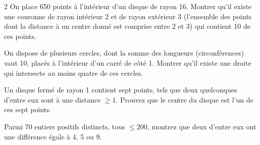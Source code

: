 \begin{problem}
    \begin{multicols}{2}
        On place 650 points à l'intérieur d'un disque de rayon 16.
        Montrer qu'il existe une couronne de rayon intérieur 2 et de rayon extérieur 3 (l'ensemble des points dont la distance à un centre donné est comprise entre 2 et 3) qui contient 10 de ces points.

        \centering

    \end{multicols}
\end{problem}

\begin{problem}
    On dispose de plusieurs cercles, dont la somme des longueurs (circonférences) vaut 10, placés à l'intérieur d'un carré de côté 1.
    Montrer qu'il existe une droite qui intersecte au moins quatre de ces cercles.
\end{problem}

\begin{problem}
    Un disque fermé de rayon 1 contient sept points, tels que deux quelconques d'entre eux sont à une distance \(\geq 1\).
    Prouvez que le centre du disque est l'un de ces sept points.
\end{problem}

\begin{problem}
    Parmi 70 entiers positifs distincts, tous \(\leq 200\), montrez que deux d'entre eux ont une différence égale à 4, 5 ou 9.
\end{problem}
